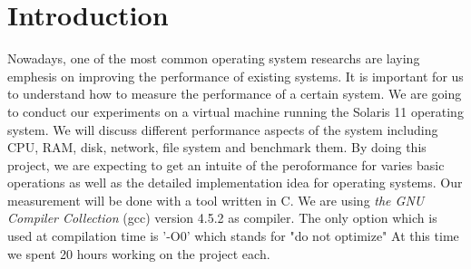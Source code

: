 \section{Introduction}

Nowadays, one of the most common operating system researchs are laying emphesis on improving the performance of existing systems.
It is important for us to understand how to measure the performance of a certain system.
We are going to conduct our experiments on a virtual machine running the Solaris
11 operating system.
We will discuss different performance aspects of the system including CPU, RAM, disk,
network, file system and benchmark them.
By doing this project, we are expecting to get an intuite of the peroformance for varies basic operations as well as the detailed implementation idea for operating systems.
Our measurement will be done with a tool written in C.
We are using \emph{the GNU Compiler Collection} (gcc) version 4.5.2 as
compiler.
The only option which is used at compilation time is '-O0' which stands for "do
not optimize"
At this time we spent 20 hours working on the project each.
